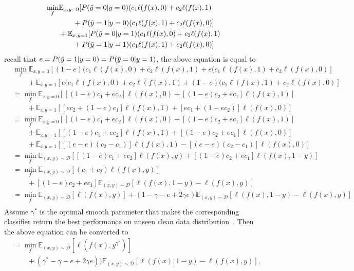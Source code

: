 \documentclass{article} \usepackage{iclr2023_conference,times}
\begin{document}
\begin{equation}
\begin{aligned}
\min_{f}&\mathbb{E}_{x.y=0}[P(\Tilde{y}=0|y=0)(c_1\ell(f(x),0)+c_2\ell(f(x),1)
\\
&\quad\quad +P(\Tilde{y}=1|y=0)(c_1\ell(f(x),1)+c_2\ell(f(x),0)]\\
&+\mathbb{E}_{x.y=1}[P(\Tilde{y}=0|y=1)(c_1\ell(f(x),0)+c_2\ell(f(x),1)\\
&\quad\quad +P(\Tilde{y}=1|y=1)(c_1\ell(f(x),1)+c_2\ell(f(x),0)] \\
\end{aligned}
\label{equ:66}
\end{equation}
recall that $e=P(\Tilde{y}=1|y=0)=P(\Tilde{y}=0|y=1)$, the above equation is equal to
\begin{equation}
\begin{aligned}
&\min_{f}\mathbb{E}_{x.y=0}\left[(1-e)(c_1\ell(f(x),0)+c_2\ell(f(x),1)+e(c_1\ell(f(x),1)+c_2\ell(f(x),0)\right]\\
&\quad\quad + \mathbb{E}_{x.y=1}\left[e(c_1\ell(f(x),0)+c_2\ell(f(x),1)+(1-e)(c_1\ell(f(x),1)+c_2\ell(f(x),0)\right]\\
&=\min_{f}\mathbb{E}_{x.y=0}\left[[(1-e)c_1+ec_2]\ell(f(x),0)+[(1-e)c_2+ec_1]\ell(f(x),1)\right]\\
&\quad\quad + \mathbb{E}_{x.y=1}\left[[ec _2+(1-e)c_1]\ell(f(x),1)+[ec_1+(1-ec_2)]\ell(f(x),0)\right] \\
& =\min_{f}\mathbb{E}_{x.y=0}\left[[(1-e)c_1+ec_2]\ell(f(x),0)+[(1-e)c_2+ec_1]\ell(f(x),1)\right]\\
&\quad\quad +\mathbb{E}_{x.y=1}\left[[(1-e)c_1+ec_2]\ell(f(x),1)+[(1-e)c_2+ec_1]\ell(f(x),0)\right]\\
&\quad\quad + \mathbb{E}_{x.y=1}\left[[(e-e)(c_2-c_1)]\ell(f(x),1)-[(e-e)(c_2-c_1)]\ell(f(x),0)\right]\\
& =\min_{f}\mathbb{E}_{(x,y)\sim\mathcal{D}}\left[[(1-e)c_1+ec_2]\ell(f(x),y)+[(1-e)c_2+ec_1]\ell(f(x),1-y)\right]\\
&=\min_{f}\mathbb{E}_{(x,y)\sim\mathcal{D}}[(c_1+c_2)\ell(f(x),y)]\\
&\quad\quad +[(1-e)c_2+ec_1]\mathbb{E}_{(x,y)\sim\mathcal{D}}\left[\ell(f(x),1-y)-\ell(f(x),y)\right]\\
&=\min_{f}\mathbb{E}_{(x,y)\sim\mathcal{D}}[\ell(f(x),y)]+(1-\gamma-e+2\gamma e)\mathbb{E}_{(x,y)\sim\mathcal{D}}[\ell(f(x),1-y)-\ell(f(x),y)]\\
\end{aligned}
\end{equation}
Assume $\gamma^*$ is the optimal smooth parameter that makes the corresponding classifier return the best performance on unseen clean data distribution~\citep{wei2021smooth}. Then the above equation can be converted to
\begin{equation}
\begin{aligned}
&=\min_{f}\mathbb{E}_{(x,y)\sim\mathcal{D}}[\ell(f(x),y^{\gamma^*})]\\
&\quad\quad +(\gamma^*-\gamma-e+2\gamma e))\mathbb{E}_{(x,y)\sim\mathcal{D}}[\ell(f(x),1-y)-\ell(f(x),y)],\\
\end{aligned}
\end{equation}
\end{document}
